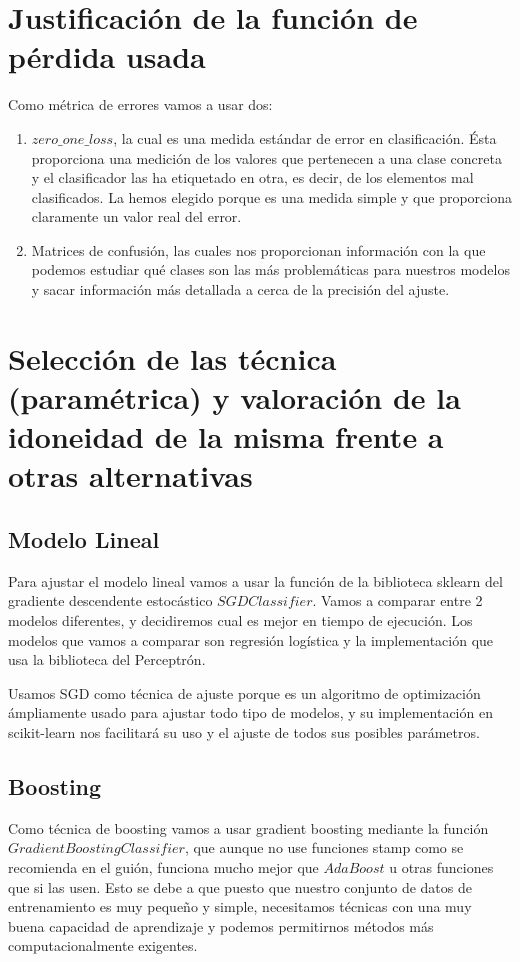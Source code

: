 \documentclass{article}
\begin{document}
	\section{Justificación de la función de pérdida usada}
	
	Como métrica de errores vamos a usar dos:
	\begin{enumerate}
		\item $zero\_one\_loss$, la cual es una medida estándar de error en clasificación. Ésta proporciona una medición de los valores que pertenecen a una clase concreta y el clasificador las ha etiquetado en otra, es decir, de los elementos mal clasificados. La hemos elegido porque es una medida simple y que proporciona claramente un valor real del error.
		\item Matrices de confusión, las cuales nos proporcionan información con la que podemos estudiar qué clases son las más problemáticas para nuestros modelos y sacar información más detallada a cerca de la precisión del ajuste.
	\end{enumerate}
	
	\section{Selección de las técnica (paramétrica) y valoración de la idoneidad de la misma frente a otras alternativas}
	
	\subsection{Modelo Lineal}
	Para ajustar el modelo lineal vamos a usar la función de la biblioteca sklearn del gradiente descendente estocástico $SGDClassifier$. Vamos a comparar entre 2 modelos diferentes, y decidiremos cual es mejor en tiempo de ejecución. Los modelos que vamos a comparar son regresión logística y la implementación que usa la biblioteca del Perceptrón.
	\par 
	Usamos SGD como técnica	de ajuste porque es un algoritmo de optimización ámpliamente usado para ajustar todo tipo de modelos, y su implementación en scikit-learn nos facilitará su uso y el ajuste de todos sus posibles parámetros. 
	\subsection{Boosting}
	Como técnica de boosting vamos a usar gradient boosting mediante la función $GradientBoostingClassifier$, que aunque no use funciones stamp como se recomienda en el guión, funciona mucho mejor que $AdaBoost$ u otras funciones que si las usen. Esto se debe a que puesto que nuestro conjunto de datos de entrenamiento es muy pequeño y simple, necesitamos técnicas con una muy buena capacidad de aprendizaje y podemos permitirnos métodos más computacionalmente exigentes. 
\end{document}
